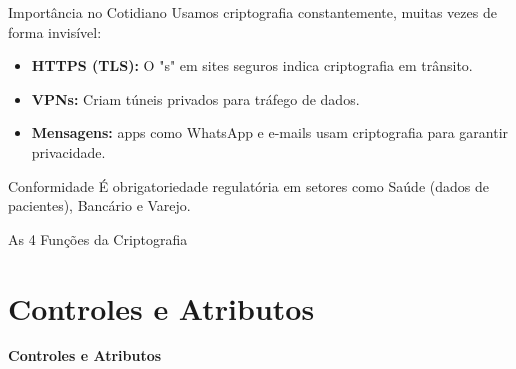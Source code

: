 \documentclass[aspectratio=169]{beamer}
\begin{document}
\begin{frame}{Importância no Cotidiano}
    Usamos criptografia constantemente, muitas vezes de forma invisível:
    \begin{itemize}
        \item \textbf{HTTPS (TLS):} O "s" em sites seguros indica criptografia em trânsito.
        \item \textbf{VPNs:} Criam túneis privados para tráfego de dados.
        \item \textbf{Mensagens:} apps como WhatsApp e e-mails usam criptografia para garantir privacidade.
    \end{itemize}
    \begin{block}{Conformidade}
        É obrigatoriedade regulatória em setores como Saúde (dados de pacientes), Bancário e Varejo.
    \end{block}
\end{frame}

\begin{frame}{As 4 Funções da Criptografia}
    \centering
\end{frame}

\section{Controles e Atributos}
{
\begin{frame}[plain]
    \centering
    \Huge \color{white} \bfseries Controles e Atributos
\end{frame}
}
\end{document}
